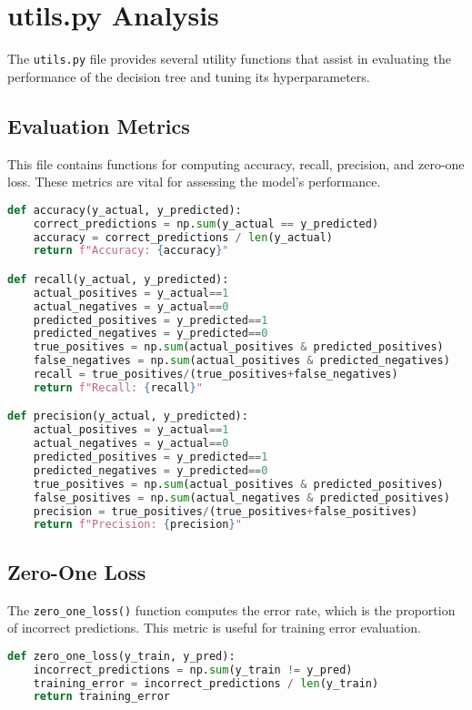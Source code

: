 \documentclass{article}
\begin{document}
\section{utils.py Analysis}
The \texttt{utils.py} file provides several utility functions that assist in evaluating the performance of the decision tree and tuning its hyperparameters.

\subsection{Evaluation Metrics}
This file contains functions for computing accuracy, recall, precision, and zero-one loss. These metrics are vital for assessing the model's performance.

\begin{lstlisting}[language=Python, caption=Evaluation Metrics]
def accuracy(y_actual, y_predicted):
    correct_predictions = np.sum(y_actual == y_predicted)
    accuracy = correct_predictions / len(y_actual)
    return f"Accuracy: {accuracy}"

def recall(y_actual, y_predicted):
    actual_positives = y_actual==1
    actual_negatives = y_actual==0
    predicted_positives = y_predicted==1
    predicted_negatives = y_predicted==0
    true_positives = np.sum(actual_positives & predicted_positives)
    false_negatives = np.sum(actual_positives & predicted_negatives)
    recall = true_positives/(true_positives+false_negatives)
    return f"Recall: {recall}"

def precision(y_actual, y_predicted):
    actual_positives = y_actual==1
    actual_negatives = y_actual==0
    predicted_positives = y_predicted==1
    predicted_negatives = y_predicted==0
    true_positives = np.sum(actual_positives & predicted_positives)
    false_positives = np.sum(actual_negatives & predicted_positives)
    precision = true_positives/(true_positives+false_positives)
    return f"Precision: {precision}"
\end{lstlisting}

\subsection{Zero-One Loss}
The \texttt{zero\_one\_loss()} function computes the error rate, which is the proportion of incorrect predictions. This metric is useful for training error evaluation.

\begin{lstlisting}[language=Python, caption=Zero-One Loss Calculation]
def zero_one_loss(y_train, y_pred):
    incorrect_predictions = np.sum(y_train != y_pred)
    training_error = incorrect_predictions / len(y_train)
    return training_error
\end{lstlisting}
\end{document}
